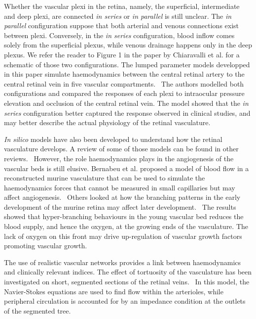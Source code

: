 \documentclass[12pt,a4paper]{journal}
\begin{document}
Whether the vascular plexi in the retina, namely, the superficial, intermediate and deep plexi, are connected \textit{in series} or \textit{in parallel} is still unclear.
The \textit{in parallel} configuration suppose that both arterial and venous connections exist between plexi.
Conversely, in the \textit{in series} configuration, blood inflow comes solely from the superficial plexus, while venous drainage happens only in the deep plexus.
We refer the reader to Figure 1 in the paper by Chiaravalli et al. for a schematic of those two configurations.\cite{Chiaravalli_2021}
The lumped parameter models developped in this paper simulate haemodynamics between the central retinal artery to the central retinal vein in five vascular compartments.~\cite{Chiaravalli_2021}
The authors modelled both configurations and compared the responses of each plexi to intraocular pressure elevation and occlusion of the central retinal vein.
The model showed that the \textit{in series} configuration better captured the response observed in clinical studies, and may better describe the actual physiology of the retinal vasculature.


\textit{In silico} models have also been developed to understand how the retinal vasculature develops.
A review of some of those models can be found in other reviews.~\cite{Arciero_2019,Roberts_2016}
However, the role haemodynamics plays in the angiogenesis of the vascular beds is still elusive.
Bernabeu et al. proposed a model of blood flow in a reconstructed murine vasculature that can be used to simulate the haemodynamics forces that cannot be measured in small capillaries but may affect angiogenesis.~\cite{Bernabeu_2014}
Others looked at how the branching patterns in the early development of the murine retina may affect later development.~\cite{Mirzapour_Shafiyi_2021}
The results showed that hyper-branching behaviours in the young vascular bed reduces the blood supply, and hence the oxygen, at the growing ends of the vasculature.
The lack of oxygen on this front may drive up-regulation of vascular growth factors promoting vascular growth.


The use of realistic vascular networks provides a link between haemodynamics and clinically relevant indices.
The effect of tortuosity of the vasculature has been investigated on short, segmented sections of the retinal veins.~\cite{Malek_2014}
In this model, the Navier-Stokes equations are used to find flow within the arterioles, while peripheral circulation is accounted for by an impedance condition at the outlets of the segmented tree.
\end{document}
